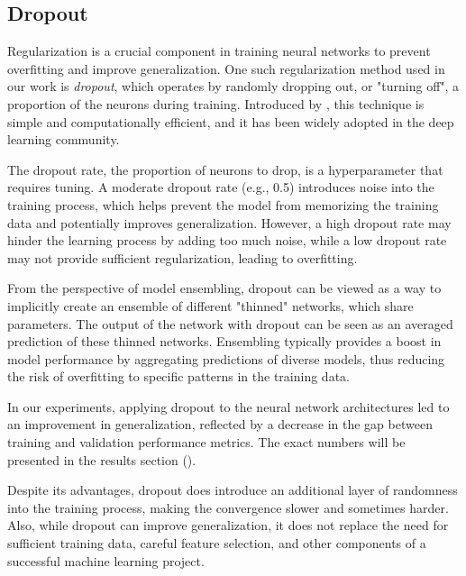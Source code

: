 \subsection{Dropout}
\label{sec:dropout}

Regularization is a crucial component in training neural networks to prevent overfitting and improve generalization. One
such regularization method used in our work is \emph{dropout}, which operates by randomly dropping out, or "turning
off", a proportion of the neurons during training. Introduced by \cite{dropout}, this
technique is simple and computationally efficient, and it has been widely adopted in the deep learning community.

The dropout rate, the proportion of neurons to drop, is a hyperparameter that requires tuning. A moderate dropout rate
(e.g., 0.5) introduces noise into the training process, which helps prevent the model from memorizing the training data
and potentially improves generalization. However, a high dropout rate may hinder the learning process by adding too much
noise, while a low dropout rate may not provide sufficient regularization, leading to overfitting.

From the perspective of model ensembling, dropout can be viewed as a way to implicitly create an ensemble of different
"thinned" networks, which share parameters. The output of the network with dropout can be seen as an averaged prediction
of these thinned networks. Ensembling typically provides a boost in model performance by aggregating predictions of
diverse models, thus reducing the risk of overfitting to specific patterns in the training data.

In our experiments, applying dropout to the neural network architectures led to an improvement in generalization,
reflected by a decrease in the gap between training and validation performance metrics. The exact numbers will be
presented in the results section ().

Despite its advantages, dropout does introduce an additional layer of randomness into the training process, making the
convergence slower and sometimes harder. Also, while dropout can improve generalization, it does not replace the need
for sufficient training data, careful feature selection, and other components of a successful machine learning project.